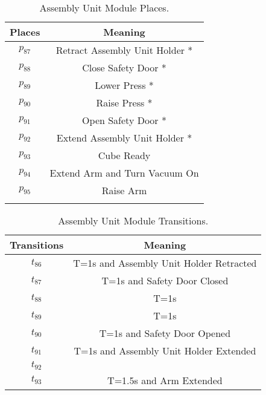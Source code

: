 \begin{table}[htbp]
\caption{Assembly Unit Module Places.}
\centering
\begin{tabular}{cc}
Places & Meaning\\
\hline
\hyperlink{partialNet:p87}{\hypertarget{partialTable:p87}{$p_{87}$}} & Retract Assembly Unit Holder *\\
\hyperlink{partialNet:p88}{\hypertarget{partialTable:p88}{$p_{88}$}} & Close Safety Door *\\
\hyperlink{partialNet:p89}{\hypertarget{partialTable:p89}{$p_{89}$}} & Lower Press *\\
\hyperlink{partialNet:p90}{\hypertarget{partialTable:p90}{$p_{90}$}} & Raise Press *\\
\hyperlink{partialNet:p91}{\hypertarget{partialTable:p91}{$p_{91}$}} & Open Safety Door *\\
\hyperlink{partialNet:p92}{\hypertarget{partialTable:p92}{$p_{92}$}} & Extend Assembly Unit Holder *\\
\hyperlink{partialNet:p93}{\hypertarget{partialTable:p93}{$p_{93}$}} & Cube Ready\\
\hyperlink{partialNet:p94}{\hypertarget{partialTable:p94}{$p_{94}$}} & Extend Arm and Turn Vacuum On\\
\hyperlink{partialNet:p95}{\hypertarget{partialTable:p95}{$p_{95}$}} & Raise Arm\\
 & \\
\end{tabular}
\end{table}

\begin{table}[htbp]
\caption{Assembly Unit Module Transitions.}
\centering
\begin{tabular}{cc}
Transitions & Meaning\\
\hline
\hyperlink{partialNet:tt86}{\hypertarget{partialTable:tt86}{$t_{86}$}} & T=1s and Assembly Unit Holder Retracted\\
\hyperlink{partialNet:tt87}{\hypertarget{partialTable:tt87}{$t_{87}$}} & T=1s and Safety Door Closed\\
\hyperlink{partialNet:tt88}{\hypertarget{partialTable:tt88}{$t_{88}$}} & T=1s\\
\hyperlink{partialNet:tt89}{\hypertarget{partialTable:tt89}{$t_{89}$}} & T=1s\\
\hyperlink{partialNet:tt90}{\hypertarget{partialTable:tt90}{$t_{90}$}} & T=1s and Safety Door Opened\\
\hyperlink{partialNet:tt91}{\hypertarget{partialTable:tt91}{$t_{91}$}} & T=1s and Assembly Unit Holder Extended\\
\hyperlink{partialNet:t92}{\hypertarget{partialTable:t92}{$t_{92}$}} & \\
\hyperlink{partialNet:tt93}{\hypertarget{partialTable:tt93}{$t_{93}$}} & T=1.5s and Arm Extended\\
\end{tabular}
\end{table}
